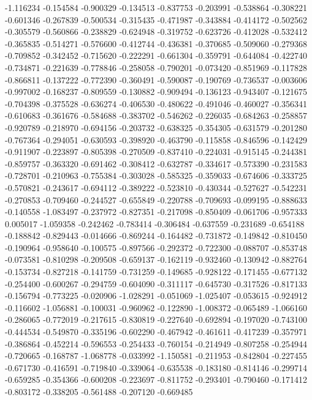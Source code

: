 -1.116234
-0.154584
-0.900329
-0.134513
-0.837753
-0.203991
-0.538864
-0.308221
-0.601346
-0.267839
-0.500534
-0.315435
-0.471987
-0.343884
-0.414172
-0.502562
-0.305579
-0.560866
-0.238829
-0.624948
-0.319752
-0.623726
-0.412028
-0.532412
-0.365835
-0.514271
-0.576600
-0.412744
-0.436381
-0.370685
-0.509060
-0.279368
-0.709852
-0.342452
-0.715620
-0.222291
-0.661304
-0.359791
-0.644084
-0.422740
-0.734871
-0.221639
-0.778846
-0.258058
-0.790201
-0.073420
-0.851969
-0.117828
-0.866811
-0.137222
-0.772390
-0.360491
-0.590087
-0.190769
-0.736537
-0.003606
-0.997002
-0.168237
-0.809559
-0.130882
-0.909494
-0.136123
-0.943407
-0.121675
-0.704398
-0.375528
-0.636274
-0.406530
-0.480622
-0.491046
-0.460027
-0.356341
-0.610683
-0.361676
-0.584688
-0.383702
-0.546262
-0.226035
-0.684263
-0.258857
-0.920789
-0.218970
-0.694156
-0.203732
-0.638325
-0.354305
-0.631579
-0.201280
-0.767364
-0.294051
-0.630593
-0.398920
-0.463790
-0.115858
-0.846596
-0.142429
-0.911907
-0.223897
-0.805398
-0.270509
-0.837410
-0.224031
-0.915145
-0.244381
-0.859757
-0.363320
-0.691462
-0.308412
-0.632787
-0.334617
-0.573390
-0.231583
-0.728701
-0.210963
-0.755384
-0.303028
-0.585325
-0.359033
-0.674606
-0.333725
-0.570821
-0.243617
-0.694112
-0.389222
-0.523810
-0.430344
-0.527627
-0.542231
-0.270853
-0.709460
-0.244527
-0.655849
-0.220788
-0.709693
-0.099195
-0.888633
-0.140558
-1.083497
-0.237972
-0.827351
-0.217098
-0.850409
-0.061706
-0.957333
0.005017
-1.059358
-0.242462
-0.783414
-0.306484
-0.637559
-0.231689
-0.654188
-0.188842
-0.829443
-0.014666
-0.869244
-0.164482
-0.731872
-0.149842
-0.810450
-0.190964
-0.958640
-0.100575
-0.897566
-0.292372
-0.722300
-0.088707
-0.853748
-0.073581
-0.810298
-0.209508
-0.659137
-0.162119
-0.932460
-0.130942
-0.882764
-0.153734
-0.827218
-0.141759
-0.731259
-0.149685
-0.928122
-0.171455
-0.677132
-0.254400
-0.600267
-0.294759
-0.604090
-0.311117
-0.645730
-0.317526
-0.817133
-0.156794
-0.773225
-0.020906
-1.028291
-0.051069
-1.025407
-0.053615
-0.924912
-0.116602
-1.056881
-0.100031
-0.960962
-0.122890
-1.008372
-0.065489
-1.066160
-0.286065
-0.772019
-0.217615
-0.830819
-0.227640
-0.692894
-0.197020
-0.743100
-0.444534
-0.549870
-0.335196
-0.602290
-0.467942
-0.461611
-0.417239
-0.357971
-0.386864
-0.452214
-0.596553
-0.254433
-0.760154
-0.214949
-0.807258
-0.254944
-0.720665
-0.168787
-1.068778
-0.033992
-1.150581
-0.211953
-0.842804
-0.227455
-0.671730
-0.416591
-0.719840
-0.339064
-0.635538
-0.183180
-0.814146
-0.299714
-0.659285
-0.354366
-0.600208
-0.223697
-0.811752
-0.293401
-0.790460
-0.171412
-0.803172
-0.338205
-0.561488
-0.207120
-0.669485
